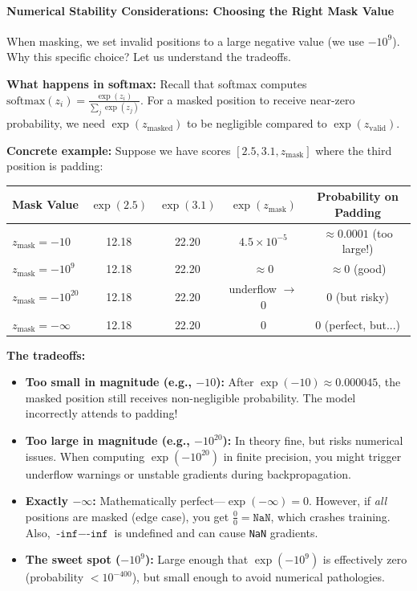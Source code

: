 \documentclass{article}
\begin{document}
\paragraph{Numerical Stability Considerations: Choosing the Right Mask Value}

When masking, we set invalid positions to a large negative value (we use $-10^9$). Why this specific choice? Let us understand the tradeoffs.

\textbf{What happens in softmax:}
Recall that softmax computes $\text{softmax}(z_i) = \frac{\exp(z_i)}{\sum_j \exp(z_j)}$. For a masked position to receive near-zero probability, we need $\exp(z_{\text{masked}})$ to be negligible compared to $\exp(z_{\text{valid}})$.

\textbf{Concrete example:}
Suppose we have scores $[2.5, 3.1, z_{\text{mask}}]$ where the third position is padding:

\begin{center}
\begin{tabular}{|l|c|c|c|c|}
\hline
\textbf{Mask Value} & $\exp(2.5)$ & $\exp(3.1)$ & $\exp(z_{\text{mask}})$ & \textbf{Probability on Padding} \\
\hline
$z_{\text{mask}} = -10$ & 12.18 & 22.20 & $4.5 \times 10^{-5}$ & $\approx 0.0001$ (too large!) \\
$z_{\text{mask}} = -10^9$ & 12.18 & 22.20 & $\approx 0$ & $\approx 0$ (good) \\
$z_{\text{mask}} = -10^{20}$ & 12.18 & 22.20 & underflow $\rightarrow$ 0 & 0 (but risky) \\
$z_{\text{mask}} = -\infty$ & 12.18 & 22.20 & 0 & 0 (perfect, but...) \\
\hline
\end{tabular}
\end{center}

\textbf{The tradeoffs:}

\begin{itemize}
    \item \textbf{Too small in magnitude (e.g., $-10$):} After $\exp(-10) \approx 0.000045$, the masked position still receives non-negligible probability. The model incorrectly attends to padding!
    
    \item \textbf{Too large in magnitude (e.g., $-10^{20}$):} In theory fine, but risks numerical issues. When computing $\exp(-10^{20})$ in finite precision, you might trigger underflow warnings or unstable gradients during backpropagation.
    
    \item \textbf{Exactly $-\infty$:} Mathematically perfect---$\exp(-\infty) = 0$. However, if \textit{all} positions are masked (edge case), you get $\frac{0}{0} = \texttt{NaN}$, which crashes training. Also, $\texttt{-inf} - \texttt{-inf}$ is undefined and can cause \texttt{NaN} gradients.
    
    \item \textbf{The sweet spot ($-10^9$):} Large enough that $\exp(-10^9)$ is effectively zero (probability $< 10^{-400}$), but small enough to avoid numerical pathologies.
\end{itemize}
\end{document}
